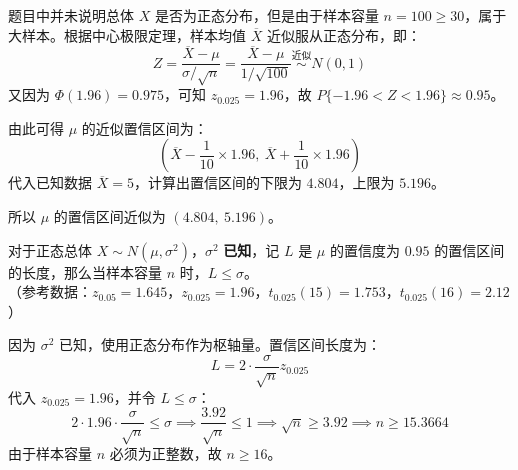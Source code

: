 ﻿\documentclass[lang=cn,11pt]{elegantbook}
\begin{document}
\begin{solution}
题目中并未说明总体 $X$ 是否为正态分布，但是由于样本容量 $n=100 \ge 30$，属于大样本。根据中心极限定理，样本均值 $\overline{X}$ 近似服从正态分布，即：
\begin{equation*}
Z = \frac{\overline{X}-\mu}{\sigma/\sqrt{n}} = \frac{\overline{X}-\mu}{1/\sqrt{100}} \stackrel{\text{近似}}{\sim} N(0,1)
\end{equation*}
又因为 $\Phi(1.96)=0.975$，可知 $z_{0.025} = 1.96$，故 $P\{-1.96 < Z < 1.96\} \approx 0.95$。

由此可得 $\mu$ 的近似置信区间为：
\begin{equation*}
\left( \overline{X} - \frac{1}{10} \times 1.96,\ \overline{X} + \frac{1}{10} \times 1.96 \right)
\end{equation*}
代入已知数据 $\overline{X}=5$，计算出置信区间的下限为 $4.804$，上限为 $5.196$。

所以 $\mu$ 的置信区间近似为 $(4.804,\ 5.196)$。
\end{solution}


\begin{exercise} \label{prob:ci_1}
对于正态总体 $X \sim N(\mu, \sigma^2)$，$\sigma^2$ \textbf{已知}，记 $L$ 是 $\mu$ 的置信度为 $0.95$ 的置信区间的长度，那么当样本容量 $n$ \underline{\qquad\qquad} 时，$L \leq \sigma$。\\
（参考数据：$z_{0.05}=1.645$，$z_{0.025}=1.96$，$t_{0.025}(15)=1.753$，$t_{0.025}(16)=2.12$）
\end{exercise}
\begin{solution}
因为 $\sigma^2$ 已知，使用正态分布作为枢轴量。置信区间长度为：
\begin{equation*}
L = 2 \cdot \frac{\sigma}{\sqrt{n}} z_{0.025}
\end{equation*}
代入 $z_{0.025}=1.96$，并令 $L \leq \sigma$：
\begin{equation*}
2 \cdot 1.96 \cdot \frac{\sigma}{\sqrt{n}} \leq \sigma \implies \frac{3.92}{\sqrt{n}} \leq 1 \implies \sqrt{n} \geq 3.92 \implies n \geq 15.3664
\end{equation*}
由于样本容量 $n$ 必须为正整数，故 $n \ge 16$。
\end{solution}
\end{document}
